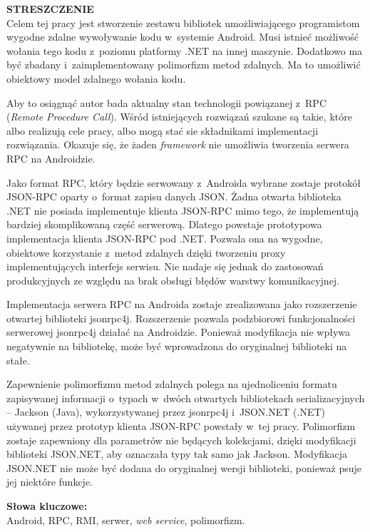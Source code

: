 \documentclass[twoside,a4paper]{book}
\begin{document}



{\noindent \large \textbf{STRESZCZENIE}} \\
Celem tej pracy jest stworzenie zestawu bibliotek umożliwiającego programistom wygodne zdalne wywoływanie kodu w~systemie Android. Musi istnieć możliwość wołania tego kodu z~poziomu platformy .NET na innej maszynie.
Dodatkowo ma być zbadany i~zaimplementowany polimorfizm metod zdalnych.
Ma to umożliwić obiektowy model zdalnego wołania kodu.

Aby to osiągnąć autor bada aktualny stan technologii powiązanej z~RPC (\emph{Remote Procedure Call}).
Wśród istniejących rozwiązań szukane są takie, które albo realizują cele pracy, albo mogą stać sie składnikami implementacji rozwiązania.
Okazuje się, że żaden \emph{framework} nie umożliwia tworzenia serwera RPC na Androidzie.

Jako format RPC, który będzie serwowany z~Androida wybrane zostaje protokół JSON-RPC oparty o~format zapisu danych JSON.
Żadna otwarta biblioteka .NET nie posiada implementuje klienta JSON-RPC mimo tego, że implementują bardziej skomplikowaną część serwerową.
Dlatego powstaje prototypowa implementacja klienta JSON-RPC pod .NET. Pozwala ona na wygodne, obiektowe korzystanie z~metod zdalnych dzięki tworzeniu proxy implementujących interfejs serwisu.
Nie nadaje się jednak do zastosowań produkcyjnych ze względu na brak obsługi błędów warstwy komunikacyjnej.

Implementacja serwera RPC na Androida zostaje zrealizowana jako rozszerzenie otwartej biblioteki jsonrpc4j.
Rozszerzenie pozwala podzbiorowi funkcjonalności serwerowej jsonrpc4j działać na Androidzie.
Ponieważ modyfikacja nie wpływa negatywnie na bibliotekę, może być wprowadzona do oryginalnej biblioteki na stałe.

Zapewnienie polimorfizmu metod zdalnych polega na ujednoliceniu formatu zapisywanej informacji o~typach w~dwóch otwartych bibliotekach serializacyjnych -- Jackson (Java), wykorzystywanej przez jsonrpc4j i~JSON.NET (.NET) używanej przez prototyp klienta JSON-RPC powstały w~tej pracy.
Polimorfizm zostaje zapewniony dla parametrów nie będących kolekcjami, dzięki modyfikacji biblioteki JSON.NET, aby oznaczała typy tak samo jak Jackson.
Modyfikacja JSON.NET nie może być dodana do oryginalnej wersji biblioteki, ponieważ psuje jej niektóre funkcje.

\noindent\textbf{Słowa kluczowe:} \\
Android, RPC, RMI, serwer, \emph{web service}, polimorfizm.
\clearpage
\end{document}
